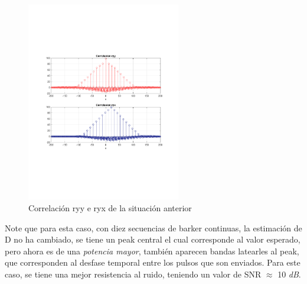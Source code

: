 		\begin{figure}[H]
			\center
			\includegraphics[width=0.6\textwidth,clip, trim = {2cm 7.0cm 2.2cm 7.0cm}]{../imgs/4_radar_e_corre.pdf}
			\caption{Correlación ryy e ryx de la situación anterior}
			\label{fig:radar_e_corre}
		\end{figure}
		
		Note que para esta caso, con diez secuencias de barker continuas, la estimación de D no ha cambiado, se tiene un peak central el cual corresponde al valor esperado, pero ahora es de una \textit{potencia mayor}, también aparecen bandas latearles al peak, que corresponden al desfase temporal entre los pulsos que son enviados. Para este caso, se tiene una mejor resistencia al ruido, teniendo un valor de SNR $\approx$ 10 \textit{dB}.